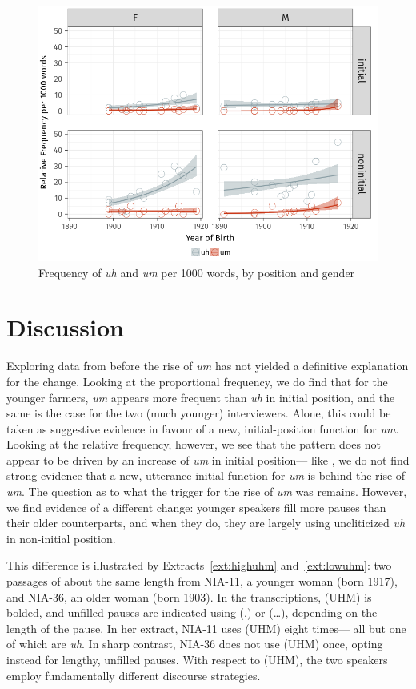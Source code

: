 \documentclass[11pt]{article}
\begin{document}
\begin{figure}[htpb]
    \centering
    \includegraphics[width=0.8\linewidth]{figures/relfreqgenderposition.png}
    \caption{Frequency of \emph{uh} and \emph{um} per 1000 words, by position
    and gender}%
    \label{fig:relfreqgenderposition}
\end{figure}


\section{Discussion}

Exploring data from before the rise of \emph{um} has not yielded a definitive
explanation for the change.
Looking at the proportional frequency, we do find that for the younger
farmers,
\emph{um} appears more frequent than \emph{uh} in initial position, and the same
is the case for the two (much younger) interviewers.
Alone, this could be taken as suggestive evidence in favour of a new,
initial-position function for \emph{um}.
Looking at the relative frequency, however, we see that the pattern does not
appear to be driven by an increase of \emph{um} in initial position---%
like \textcite{fruehwald2016}, we do not find strong evidence that a new,
utterance-initial function for \emph{um} is behind the rise of \emph{um}.
The question as to what the trigger for the rise of \emph{um} was remains.
However, we find evidence of a different change:
younger speakers fill more pauses than their older counterparts, and when they
do, they are largely using uncliticized \emph{uh} in non-initial position.

This difference is illustrated by Extracts~\ref{ext:highuhm}
and~\ref{ext:lowuhm}:
two passages of about the same length from NIA-11, a younger woman (born 1917),
and NIA-36, an older woman (born 1903).
In the transcriptions, (UHM) is bolded, and unfilled pauses are indicated using
(.) or (\ldots), depending on the length of the pause.
In her extract, NIA-11 uses (UHM) eight times---%
all but one of which are \emph{uh}.
In sharp contrast, NIA-36 does not use (UHM) once, opting instead for lengthy,
unfilled pauses.
With respect to (UHM), the two speakers employ fundamentally different discourse
strategies.
\end{document}
